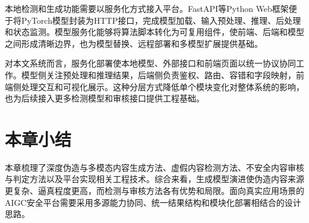本地检测和生成功能需要以服务化方式接入平台。FastAPI等Python Web框架便于将PyTorch模型封装为HTTP接口，完成模型加载、输入预处理、推理、后处理和状态监测。模型服务化能够将算法脚本转化为可复用组件，使前端、后端和模型之间形成清晰边界，也为模型替换、远程部署和多模型扩展提供基础。

对本文系统而言，服务化部署使本地模型、外部接口和前端页面以统一协议协同工作。模型侧关注预处理和推理结果，后端侧负责鉴权、路由、容错和字段映射，前端侧处理交互和可视化展示。这种分层方式降低单个模块变化对整体系统的影响，也为后续接入更多检测模型和审核接口提供工程基础。

\section{本章小结}

本章梳理了深度伪造与多模态内容生成方法、虚假内容检测方法、不安全内容审核与判定方法以及平台实现相关工程技术。综合来看，生成模型演进使伪造内容来源更复杂、逼真程度更高，而检测与审核方法各有优势和局限。面向真实应用场景的AIGC安全平台需要采用多源能力协同、统一结果结构和模块化部署相结合的设计思路。
